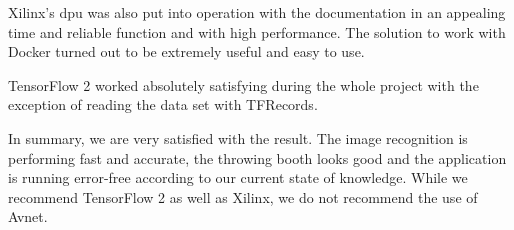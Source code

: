 Xilinx's \acrshort{dpu} was also put into operation with the documentation in an appealing time and reliable function and with high performance.
The solution to work with Docker turned out to be extremely useful and easy to use.

TensorFlow 2 worked absolutely satisfying during the whole project with the exception of reading the data set with TFRecords. 

In summary, we are very satisfied with the result. 
The image recognition is performing fast and accurate, the throwing booth looks good and the application is running error-free according to our current state of knowledge.
While we recommend TensorFlow 2 as well as Xilinx, we do not recommend the use of Avnet.
